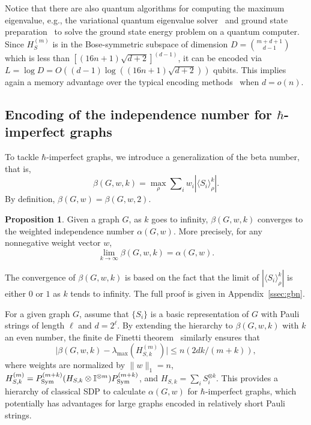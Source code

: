 \documentclass[
12pt,
prx,
aps,
reprint,
a4paper,
longbibliograph,
nofootinbib,
nobibnotes,
superscriptaddress
]{revtex4-2}
\theoremstyle{definition}
\newtheorem{proposition}{Proposition}
\def\id{\mathbb{I}}%
\begin{document}
Notice that there are also quantum algorithms for computing the maximum eigenvalue, e.g., the variational quantum eigenvalue solver~\cite{Peruzzo2013AVE} and ground state preparation~\cite{Lin2020NearoptimalGS} to solve the ground state energy problem on a quantum computer. 
Since $H_S^{(m)}$ is in the Bose-symmetric subspace of dimension $D = {m+d+1 \choose d-1}$ which is less than $[(16n+1)\sqrt{d+2}]^{(d-1)}$, it can be encoded via $ L = \log D = O( (d-1) \log((16n+1)\sqrt{d+2}) )$ qubits. This implies again a memory advantage over the typical encoding methods~\cite{Farhi2014AQA,Zhou2018QuantumAO,Skolik2022EquivariantQC} when $d=o(n)$.







\subsection{\texorpdfstring{Encoding of the independence number for $\mathbf{\hbar}$-imperfect graphs}{}}
To tackle $\hbar$-imperfect graphs, we introduce a generalization of the beta number, that is,
\begin{equation}
	\beta(G,w,k) = \max_{\rho} \sum\nolimits_i w_i |\langle S_i\rangle^k_{\rho}|.
\end{equation}
By definition, $\beta(G,w) = \beta(G,w,2)$.
\begin{proposition}
\label{prop:convergence_generalized_beta}
Given a graph $G$, as $k$ goes to infinity, $\beta(G,w,k)$ converges to the weighted independence number $\alpha(G,w)$.
More precisely, for any nonnegative weight vector $w$,
\begin{equation}
	\lim_{k\to \infty} \beta(G,w,k) = \alpha(G,w).
\end{equation}    
\end{proposition}
The convergence of $\beta(G,w,k)$ is based on the fact that the limit of $|\langle S_i\rangle^k_{\rho}|$ is either $0$ or $1$ as $k$ tends to infinity. The full proof is given in Appendix~\ref{ssec:gbn}.

For a given graph $G$, assume that $\{S_i\}$ is a basic representation of $G$ with Pauli strings of length $\ell$ and $d=2^\ell$.
By extending the hierarchy to $\beta(G,w,k)$ with $k$ an even number, the finite de Finetti theorem~\cite[Thm.~II.8]{Christandl2007} similarly ensures that
\begin{equation}
	\big|\beta(G,w,k) - \lambda_{\max}(H_{S,k}^{(m)})\big| \le n (2dk/(m+k)),
\end{equation}
where weights are normalized by $\|w\|_1 = n$, $H_{S,k}^{(m)} = P_{\rm Sym}^{(m+k)} (H_{S,k}\otimes \id^{\otimes m}) P_{\rm Sym}^{(m+k)}$, and $H_{S,k} = \sum_i S_i^{\otimes k}$.
This provides a hierarchy of classical SDP to calculate $\alpha(G,w)$ for $\hbar$-imperfect graphs, which potentially has advantages for large graphs encoded in relatively short Pauli strings.
\end{document}
